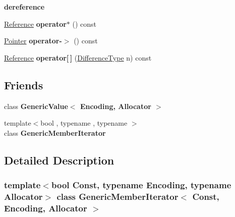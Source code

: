 \begin{Indent}\textbf{ dereference}\par
\begin{DoxyCompactItemize}
\item 
\mbox{\label{class_generic_member_iterator_a56ad403f7e7a35d6060931685d6cbbe8}} 
\hyperlink{class_generic_member_iterator_ae80f6b601eb9e24f73aa75fb32b35c65}{Reference} {\bfseries operator$\ast$} () const
\item 
\mbox{\label{class_generic_member_iterator_abc95a8e52653a8baa2927b03239f4be9}} 
\hyperlink{class_generic_member_iterator_ac69f141f1fde31c1f550f524a69c5de9}{Pointer} {\bfseries operator-\/$>$} () const
\item 
\mbox{\label{class_generic_member_iterator_a41b59f1bd367a98ee5d1138cc81e98a7}} 
\hyperlink{class_generic_member_iterator_ae80f6b601eb9e24f73aa75fb32b35c65}{Reference} {\bfseries operator\mbox{[}$\,$\mbox{]}} (\hyperlink{class_generic_member_iterator_a902b99c8ae351cd7626514dc5f30740a}{Difference\+Type} n) const
\end{DoxyCompactItemize}
\end{Indent}
\subsection*{Friends}
\begin{DoxyCompactItemize}
\item 
\mbox{\label{class_generic_member_iterator_a82bdd5798f1a5ac0e3e7ba4bd6938cfc}} 
class {\bfseries Generic\+Value$<$ Encoding, Allocator $>$}
\item 
\mbox{\label{class_generic_member_iterator_aa375aeb1ffac85cddc3a72a6c24ec6e1}} 
{\footnotesize template$<$bool , typename , typename $>$ }\\class {\bfseries Generic\+Member\+Iterator}
\end{DoxyCompactItemize}


\subsection{Detailed Description}
\subsubsection*{template$<$bool Const, typename Encoding, typename Allocator$>$\newline
class Generic\+Member\+Iterator$<$ Const, Encoding, Allocator $>$}

